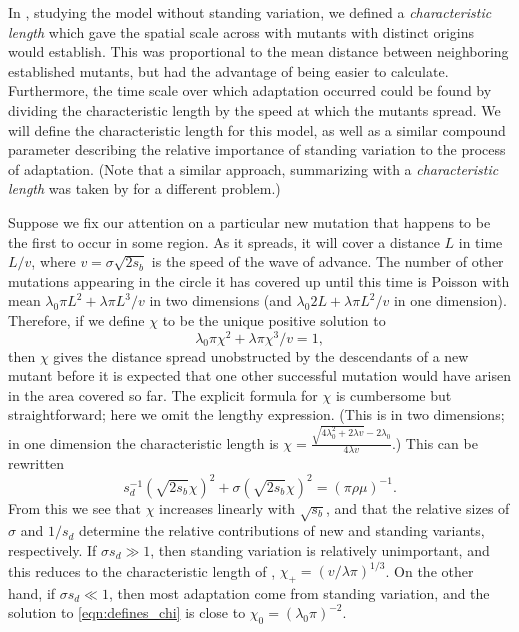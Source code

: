 \documentclass{article}
\begin{document}

In \citet{ralphcoop2010}, studying the model without standing variation,
we defined a {\em characteristic length} which gave the spatial scale across with mutants with distinct origins would establish.
This was proportional to the mean distance between neighboring established mutants,
but had the advantage of being easier to calculate.
Furthermore, the time scale over which adaptation occurred could be found by dividing the characteristic length 
by the speed at which the mutants spread.
We will define the characteristic length for this model,
as well as a similar compound parameter describing the relative importance of standing variation to the process of adaptation.
(Note that a similar approach, summarizing with a {\em characteristic length} was taken by \citep{slatkin1973geneflow} for a different problem.)

Suppose we fix our attention on a particular new mutation that happens to be the first to occur in some region.
As it spreads, it will cover a distance $L$ in time $L/v$, where $v = \sigma \sqrt{2s_b}$ is the speed of the wave of advance.
The number of other mutations appearing in the circle it has covered up until this time is Poisson with mean
$\lambda_0 \pi L^2 + \lambda \pi L^3 /v$ in two dimensions
(and $\lambda_0 2 L + \lambda \pi L^2 /v$ in one dimension).
Therefore, if we define $\chi$ to be the unique positive solution to
\[
    \lambda_0 \pi \chi^2 + \lambda \pi \chi^3 /v = 1,
\]
then $\chi$ gives the distance spread unobstructed by the descendants of a new mutant
before it is expected that one other successful mutation would have arisen in the area covered so far.
The explicit formula for $\chi$ is cumbersome but straightforward; here we omit the lengthy expression.
(This is in two dimensions; in one dimension the characteristic length is $\chi = \frac{ \sqrt{ 4 \lambda_0^2 + 2\lambda v } - 2 \lambda_0 }{ 4 \lambda v }$.)
This can be rewritten 
\begin{equation} \label{eqn:defines_chi}
    s_d^{-1} (\sqrt{2s_b} \chi)^2 + \sigma (\sqrt{2s_b} \chi)^2 = (\pi \rho \mu)^{-1} .
\end{equation}
From this we see that $\chi$ increases linearly with $\sqrt{s_b}$,
and that the relative sizes of $\sigma$ and $1/s_d$ determine the relative contributions of new and standing variants, respectively.
If $\sigma s_d \gg 1$, then standing variation is relatively unimportant, 
and this reduces to the characteristic length of \citet{ralphcoop2010}, $\chi_+ = (v/\lambda \pi)^{1/3}$.
On the other hand, if $\sigma s_d \ll 1$, then most adaptation come from standing variation, 
and the solution to \eqref{eqn:defines_chi} is close to $\chi_0 = (\lambda_0 \pi)^{-2}$. 
\end{document}
